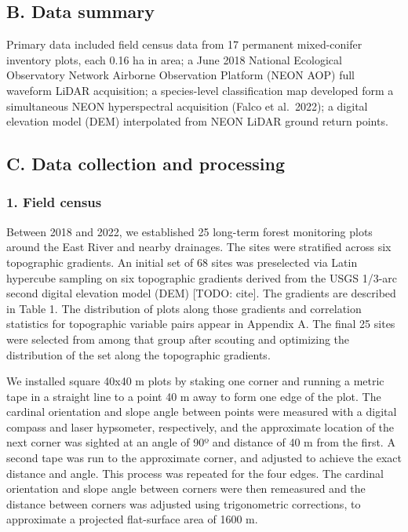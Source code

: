 \documentclass[
  12pt,
]{article}
\begin{document}
\hypertarget{b.-data-summary}{%
\subsection{B. Data summary}\label{b.-data-summary}}

Primary data included field census data from 17 permanent mixed-conifer
inventory plots, each 0.16 ha in area; a June 2018 National Ecological
Observatory Network Airborne Observation Platform (NEON AOP) full
waveform LiDAR acquisition; a species-level classification map developed
form a simultaneous NEON hyperspectral acquisition (Falco et al.~2022);
a digital elevation model (DEM) interpolated from NEON LiDAR ground
return points.

\hypertarget{c.-data-collection-and-processing}{%
\subsection{C. Data collection and
processing}\label{c.-data-collection-and-processing}}

\hypertarget{field-census}{%
\subsubsection{1. Field census}\label{field-census}}

Between 2018 and 2022, we established 25 long-term forest monitoring
plots around the East River and nearby drainages. The sites were
stratified across six topographic gradients. An initial set of 68 sites
was preselected via Latin hypercube sampling on six topographic
gradients derived from the USGS 1/3-arc second digital elevation model
(DEM) {[}TODO: cite{]}. The gradients are described in Table 1. The
distribution of plots along those gradients and correlation statistics
for topographic variable pairs appear in Appendix A. The final 25 sites
were selected from among that group after scouting and optimizing the
distribution of the set along the topographic gradients.

We installed square 40x40 m plots by staking one corner and running a
metric tape in a straight line to a point 40 m away to form one edge of
the plot. The cardinal orientation and slope angle between points were
measured with a digital compass and laser hypsometer, respectively, and
the approximate location of the next corner was sighted at an angle of
90º and distance of 40 m from the first. A second tape was run to the
approximate corner, and adjusted to achieve the exact distance and
angle. This process was repeated for the four edges. The cardinal
orientation and slope angle between corners were then remeasured and the
distance between corners was adjusted using trigonometric corrections,
to approximate a projected flat-surface area of 1600 m.
\end{document}
